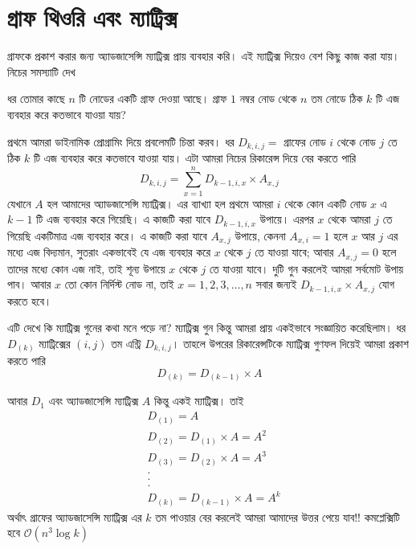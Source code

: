 \section{গ্রাফ থিওরি এবং ম্যাট্রিক্স}
গ্রাফকে প্রকাশ করার জন্য অ্যাডজাসেন্সি ম্যাট্রিক্স প্রায় ব্যবহার করি। এই ম্যাট্রিক্স দিয়েও বেশ কিছু কাজ করা যায়। নিচের সমস্যাটি দেখ 
\begin{problem}
ধর তোমার কাছে $n$ টি নোডের একটি গ্রাফ দেওয়া আছে। গ্রাফ $1$ নম্বর নোড থেকে $n$ তম নোডে ঠিক $k$ টি এজ ব্যবহার করে কতভাবে যাওয়া যায়?  
\end{problem}
\begin{solution}
প্রথমে আমরা ডাইনামিক প্রোগ্রামিং দিয়ে প্রবলেমটি চিন্তা করব। ধর $D_{k, i, j} = $ গ্রাফের নোড $i$ থেকে নোড $j$ তে ঠিক $k$ টি এজ ব্যবহার করে কতভাবে যাওয়া যায়।  এটা আমরা নিচের রিকারেন্স দিয়ে বের করতে পারি 
$$ D_{k, i, j} = \sum_{x = 1}^{n} D_{k - 1, i, x} \times A_{x, j} $$
যেখানে $A$ হল আমাদের অ্যাডজাসেন্সি ম্যাট্রিক্স। এর ব্যাখ্যা হল প্রথমে আমরা $i$ থেকে কোন একটি নোড $x$ এ $k - 1$ টি এজ ব্যবহার করে গিয়েছি। এ কাজটি করা যাবে $D_{k - 1, i, x}$ উপায়ে। এরপর $x$ থেকে আমরা $j$ তে গিয়েছি একটিমাত্র এজ ব্যবহার করে। এ কাজটি করা যাবে $A_{x, j}$ উপায়ে, কেননা $A_{x, i} = 1$ হলে $x$ আর $j$ এর মধ্যে এজ বিদ্যমান, সুতরাং একভাবেই যে এজ ব্যবহার করে $x$ থেকে $j$ তে যাওয়া যাবে; আবার $A_{x, j} = 0$ হলে তাদের মধ্যে কোন এজ নাই, তাই শূন্য উপায়ে $x$ থেকে $j$ তে যাওয়া যাবে। দুটি গুন করলেই আমরা সর্বমোট উপায় পাব। আবার $x$ তো কোন নির্দিস্ট নোড না, তাই $x = 1, 2, 3, \dots, n$ সবার জন্যই $ D_{k - 1, i, x} \times A_{x, j} $ যোগ করতে হবে। 

এটি দেখে কি ম্যাট্রিক্স গুনের কথা মনে পড়ে না? ম্যাট্রিক্স গুন কিন্তু আমরা প্রায় একইভাবে সংজ্ঞায়িত করেছিলাম। ধর $D_{(k)}$ ম্যাট্রিক্সের $(i, j)$ তম এন্ট্রি $D_{k, i, j}$। তাহলে উপরের রিকারেন্সটিকে ম্যাট্রিক্স গুণফল দিয়েই আমরা প্রকাশ করতে পারি 
$$ D_{(k)} = D_{(k - 1)} \times A$$

আবার $D_{1}$ এবং  অ্যাডজাসেন্সি ম্যাট্রিক্স $A$ কিন্তু একই ম্যাট্রিক্স। তাই 
\begin{align*}
& D_{(1)} = A \\
& D_{(2)} = D_{(1)} \times A = A^2 \\
& D_{(3)} = D_{(2)} \times A = A^3 \\
& . \\
& . \\
& . \\
& D_{(k)} = D_{(k - 1)} \times A = A^k  
\end{align*}
অর্থাৎ গ্রাফের  অ্যাডজাসেন্সি ম্যাট্রিক্স এর $k$ তম পাওয়ার বের করলেই আমরা আমাদের উত্তর পেয়ে যাব!! কমপ্লেক্সিটি হবে $\mathcal{O}(n^3\log{k})$
\end{solution}

